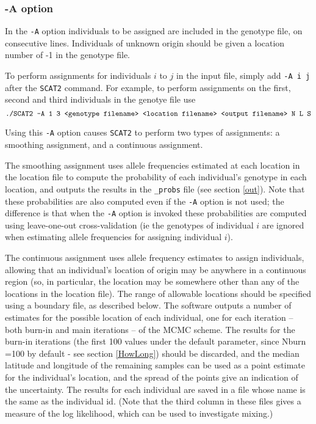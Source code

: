 \documentclass[11pt,titlepage,times,letterpaper]{article}
\def\SCAT{{\tt SCAT2} }
\begin{document}
\subsubsection{-A option}

In the {\tt -A} option
individuals to be assigned are included in the genotype file, on
consecutive lines. Individuals of unknown origin should be given a
location number of -1 in the genotype file.  

To perform assignments for individuals $i$ to $j$ in the input file,
simply add {\tt -A i j} after the \SCAT command. For example, to
perform assignments on the first, second and third individuals in the
genotye file use
$$\text{\tt ./SCAT2 -A 1 3 <genotype filename> <location filename> <output
filename> N L S}$$

Using this {\tt -A} option causes \SCAT to perform two types of
assignments: a smoothing assignment, and a continuous assignment.  

The smoothing assignment uses allele frequencies estimated at each
location in the location file to compute the probability of each
individual's genotype in each location, and outputs the results in the
{\tt \_probs} file (see section \ref{out}). Note that these
probabilities are also computed even if the {\tt -A} option is not
used; the difference is that when the {\tt -A} option is invoked these
probabilities are computed using leave-one-out cross-validation (ie
the genotypes of individual $i$ are ignored when estimating allele
frequencies for assigning individual $i$).

The continuous assignment uses allele frequency estimates to assign
individuals, allowing that an individual's location of origin may be
anywhere in a continuous region (so, in particular, the location may
be somewhere other than any of the locations in the location
file). The range of allowable locations should be specified using a
boundary file, as described below. The software outputs a number of
estimates for the possible location of each individual, one for each
iteration -- both burn-in and main iterations -- of the MCMC
scheme. The results for the burn-in iterations (the first 100 values
under the default parameter, since Nburn =100 by default - see section
\ref{HowLong}) should be discarded, and the median latitude and
longitude of the remaining samples can be used as a point estimate for
the individual's location, and the spread of the points give an
indication of the uncertainty. The results for each individual are saved in a file whose name is the same as the individual id. (Note that the third column in
these files gives a measure of the log likelihood, which can be
used to investigate mixing.)
\end{document}

